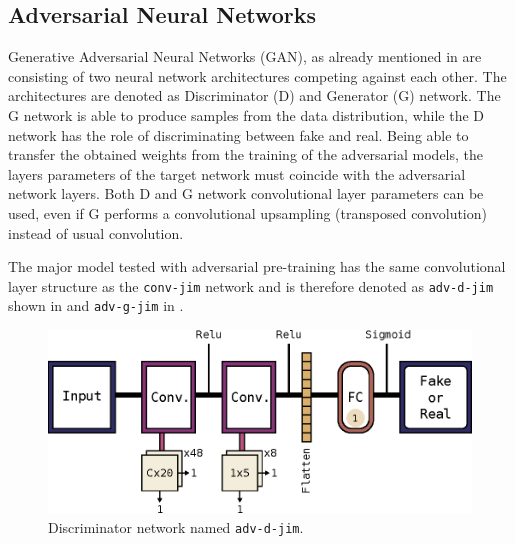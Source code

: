 
\subsection{Adversarial Neural Networks}\label{sec:nn_arch_adv}
Generative Adversarial Neural Networks (GAN), as already mentioned in  are consisting of two neural network architectures competing against each other.
The architectures are denoted as Discriminator (D) and Generator (G) network.
The G network is able to produce samples from the data distribution, while the D network has the role of discriminating between fake and real.
Being able to transfer the obtained weights from the training of the adversarial models, the layers parameters of the target network must coincide with the adversarial network layers.
Both D and G network convolutional layer parameters can be used, even if G performs a convolutional upsampling (transposed convolution) instead of usual convolution.

The major model tested with adversarial pre-training has the same convolutional layer structure as the \texttt{conv-jim} network and is therefore denoted as \texttt{adv-d-jim} shown in  and \texttt{adv-g-jim} in .

\begin{figure}[!ht]
  \centering
    \includegraphics[height=0.2\textwidth]{./4_nn/figs/nn_arch_adv_d_jim.eps}
  \caption{Discriminator network named \texttt{adv-d-jim}.}
  \label{fig:nn_arch_adv_d_jim}
\end{figure}
\FloatBarrier
\noindent

